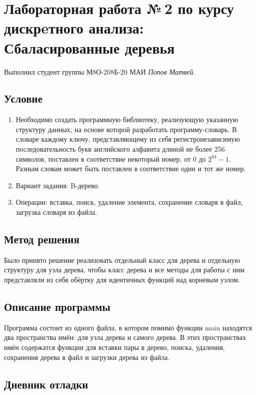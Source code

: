 \documentclass[12pt]{article}
\begin{document}
\section*{Лабораторная работа №\,2 по курсу дискрeтного анализа: Сбаласированные деревья}

Выполнил студент группы М8О-208Б-20 МАИ \textit{Попов Матвей}.

\subsection*{Условие}

\begin{enumerate}
\item Необходимо создать программную библиотеку, реализующую указанную структуру данных, 
на основе которой разработать программу-словарь. В словаре каждому ключу, представляющему 
из себя регистронезависимую последовательность букв английского алфавита длиной не более 
256 символов, поставлен в соответствие некоторый номер, от $0$ до $2^{64} - 1$. Разным словам 
может быть поставлен в соответствие один и тот же номер.
\item Вариант задания: B-дерево.
\item Операции: вставка, поиск, удаление элемента, сохранение словаря в файл, загрузка словаря 
из файла.
\end{enumerate}

\subsection*{Метод решения}

Было принято решение реализовать отдельный класс для дерева и отдельную структуру для узла 
дерева, чтобы класс дерева и все методы для работы с ним представляли из себя обёртку для 
идентичных функций над корневым узлом.

\subsection*{Описание программы}

Программа состоит из одного файла, в котором помимо функции main находятся два пространства 
имён: для узла дерева и самого дерева. В этих пространствах имён содержатся функции для 
вставки пары в дерево, поиска, удаления, сохранения дерева в файл и загрузки дерева из файла.

\subsection*{Дневник отладки}
\end{document}
